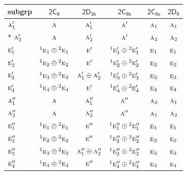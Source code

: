 \documentclass[10pt,a4paper]{article}
\numberwithin{equation}{section}
\newcommand{\grp}[1]{\mathsf{#1}}
\newcommand{\irr}[1]{\text{\normalfont\scshape #1}}
\newcommand{\conjpair}[1]{{}^{#1}}
\begin{document}
{\small\begin{longtable}{@{}lccccc@{}}\toprule
subgrp & \href{2C9.pdf}{$\grp{2C_{9}}$} & \href{2D3h.pdf}{$\grp{2D_{3h}}$} & \href{2C9h.pdf}{$\grp{2C_{9h}}$} & \href{2C9v.pdf}{$\grp{2C_{9v}}$} & \href{2D9.pdf}{$\grp{2D_{9}}$}\\\midrule\endhead
\bottomrule\endfoot\endlastfoot
$\irr{a}_{1}'$ & $\irr{a}$ & $\irr{a}_{1}'$ & $\irr{a}'$ & $\irr{a}_{1}$ & $\irr{a}_{1}$\\*
$\irr{a}_{2}'$ & $\irr{a}$ & $\irr{a}_{2}'$ & $\irr{a}'$ & $\irr{a}_{2}$ & $\irr{a}_{2}$\\
$\irr{e}_{1}'$ & $\conjpair{1}\irr{e}_{1}\oplus \conjpair{2}\irr{e}_{1}$ & $\irr{e}'$ & $\conjpair{1}\irr{e}_{1}'\oplus \conjpair{2}\irr{e}_{1}'$ & $\irr{e}_{1}$ & $\irr{e}_{1}$\\
$\irr{e}_{2}'$ & $\conjpair{1}\irr{e}_{2}\oplus \conjpair{2}\irr{e}_{2}$ & $\irr{e}'$ & $\conjpair{1}\irr{e}_{2}'\oplus \conjpair{2}\irr{e}_{2}'$ & $\irr{e}_{2}$ & $\irr{e}_{2}$\\
$\irr{e}_{3}'$ & $\conjpair{1}\irr{e}_{3}\oplus \conjpair{2}\irr{e}_{3}$ & $\irr{a}_{1}'\oplus \irr{a}_{2}'$ & $\conjpair{1}\irr{e}_{3}'\oplus \conjpair{2}\irr{e}_{3}'$ & $\irr{e}_{3}$ & $\irr{e}_{3}$\\
$\irr{e}_{4}'$ & $\conjpair{1}\irr{e}_{4}\oplus \conjpair{2}\irr{e}_{4}$ & $\irr{e}'$ & $\conjpair{1}\irr{e}_{4}'\oplus \conjpair{2}\irr{e}_{4}'$ & $\irr{e}_{4}$ & $\irr{e}_{4}$\\
$\irr{a}_{1}''$ & $\irr{a}$ & $\irr{a}_{1}''$ & $\irr{a}''$ & $\irr{a}_{2}$ & $\irr{a}_{1}$\\
$\irr{a}_{2}''$ & $\irr{a}$ & $\irr{a}_{2}''$ & $\irr{a}''$ & $\irr{a}_{1}$ & $\irr{a}_{2}$\\
$\irr{e}_{1}''$ & $\conjpair{1}\irr{e}_{1}\oplus \conjpair{2}\irr{e}_{1}$ & $\irr{e}''$ & $\conjpair{1}\irr{e}_{1}''\oplus \conjpair{2}\irr{e}_{1}''$ & $\irr{e}_{1}$ & $\irr{e}_{1}$\\
$\irr{e}_{2}''$ & $\conjpair{1}\irr{e}_{2}\oplus \conjpair{2}\irr{e}_{2}$ & $\irr{e}''$ & $\conjpair{1}\irr{e}_{2}''\oplus \conjpair{2}\irr{e}_{2}''$ & $\irr{e}_{2}$ & $\irr{e}_{2}$\\
$\irr{e}_{3}''$ & $\conjpair{1}\irr{e}_{3}\oplus \conjpair{2}\irr{e}_{3}$ & $\irr{a}_{1}''\oplus \irr{a}_{2}''$ & $\conjpair{1}\irr{e}_{3}''\oplus \conjpair{2}\irr{e}_{3}''$ & $\irr{e}_{3}$ & $\irr{e}_{3}$\\
$\irr{e}_{4}''$ & $\conjpair{1}\irr{e}_{4}\oplus \conjpair{2}\irr{e}_{4}$ & $\irr{e}''$ & $\conjpair{1}\irr{e}_{4}''\oplus \conjpair{2}\irr{e}_{4}''$ & $\irr{e}_{4}$ & $\irr{e}_{4}$\\

\end{longtable}}
\end{document}
